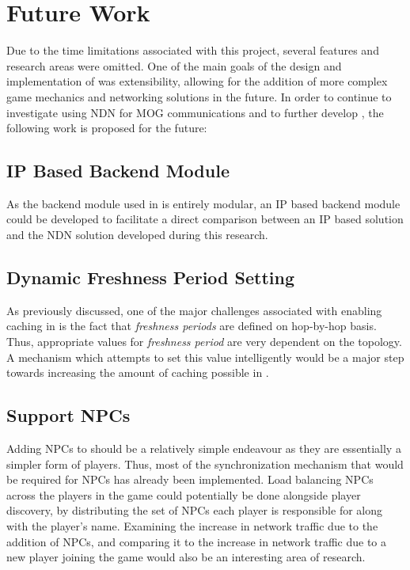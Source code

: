 \section{Future Work}\label{sec:conc:fw}
Due to the time limitations associated with this project, several features and research areas were omitted. One of the main goals of the design and implementation of \game{} was extensibility, allowing for the addition of more complex game mechanics and networking solutions in the future. In order to continue to investigate using NDN for MOG communications and to further develop \game{}, the following work is proposed for the future:

\subsection{IP Based Backend Module}
As the backend module used in \game{} is entirely modular, an IP based backend module could be developed to facilitate a direct comparison between an IP based solution and the NDN solution developed during this research.

\subsection{Dynamic Freshness Period Setting}
As previously discussed, one of the major challenges associated with enabling caching in \game{} is the fact that \textit{freshness periods} are defined on hop-by-hop basis. Thus, appropriate values for \textit{freshness period} are very dependent on the topology. A mechanism which attempts to set this value intelligently would be a major step towards increasing the amount of caching possible in \game{}.

\subsection{Support NPCs}
Adding NPCs to \game{} should be a relatively simple endeavour as they are essentially a simpler form of players. Thus, most of the synchronization mechanism that would be required for NPCs has already been implemented. Load balancing NPCs across the players in the game could potentially be done alongside player discovery, by distributing the set of NPCs each player is responsible for along with the player's name. Examining the increase in network traffic due to the addition of NPCs, and comparing it to the increase in network traffic due to a new player joining the game would also be an interesting area of research.

